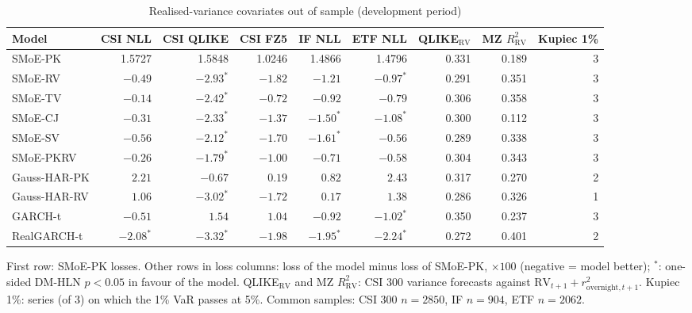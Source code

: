 \begin{table}[!htbp]\centering\footnotesize
\caption{Realised-variance covariates out of sample (development period)}\label{tab:rv-oos}
\begin{adjustbox}{max width=\textwidth}
\begin{tabular}{lrrrrrrrr}
\toprule
Model & CSI NLL & CSI QLIKE & CSI FZ5 & IF NLL & ETF NLL & QLIKE$_{\mathrm{RV}}$ & MZ $R^2_{\mathrm{RV}}$ & Kupiec 1\%\\
\midrule
SMoE-PK & 1.5727 & 1.5848 & 1.0246 & 1.4866 & 1.4796 & 0.331 & 0.189 & 3\\
SMoE-RV & $-0.49$ & $-2.93^{*}$ & $-1.82$ & $-1.21$ & $-0.97^{*}$ & 0.291 & 0.351 & 3\\
SMoE-TV & $-0.14$ & $-2.42^{*}$ & $-0.72$ & $-0.92$ & $-0.79$ & 0.306 & 0.358 & 3\\
SMoE-CJ & $-0.31$ & $-2.33^{*}$ & $-1.37$ & $-1.50^{*}$ & $-1.08^{*}$ & 0.300 & 0.112 & 3\\
SMoE-SV & $-0.56$ & $-2.12^{*}$ & $-1.70$ & $-1.61^{*}$ & $-0.56$ & 0.289 & 0.338 & 3\\
SMoE-PKRV & $-0.26$ & $-1.79^{*}$ & $-1.00$ & $-0.71$ & $-0.58$ & 0.304 & 0.343 & 3\\
Gauss-HAR-PK & $2.21$ & $-0.67$ & $0.19$ & $0.82$ & $2.43$ & 0.317 & 0.270 & 2\\
Gauss-HAR-RV & $1.06$ & $-3.02^{*}$ & $-1.72$ & $0.17$ & $1.38$ & 0.286 & 0.326 & 1\\
GARCH-t & $-0.51$ & $1.54$ & $1.04$ & $-0.92$ & $-1.02^{*}$ & 0.350 & 0.237 & 3\\
RealGARCH-t & $-2.08^{*}$ & $-3.32^{*}$ & $-1.98$ & $-1.95^{*}$ & $-2.24^{*}$ & 0.272 & 0.401 & 2\\
\bottomrule
\end{tabular}
\end{adjustbox}
\par\smallskip\begin{minipage}{\textwidth}\footnotesize
First row: SMoE-PK losses. Other rows in loss columns: loss of the model minus loss of SMoE-PK, $\times100$ (negative = model better); $^*$: one-sided DM-HLN $p<0.05$ in favour of the model. QLIKE$_{\mathrm{RV}}$ and MZ $R^2_{\mathrm{RV}}$: CSI 300 variance forecasts against $\mathrm{RV}_{t+1}+r^2_{\text{overnight},t+1}$. Kupiec 1\%: series (of 3) on which the 1\% VaR passes at 5\%. Common samples: CSI 300 $n=2850$, IF $n=904$, ETF $n=2062$.
\end{minipage}
\end{table}